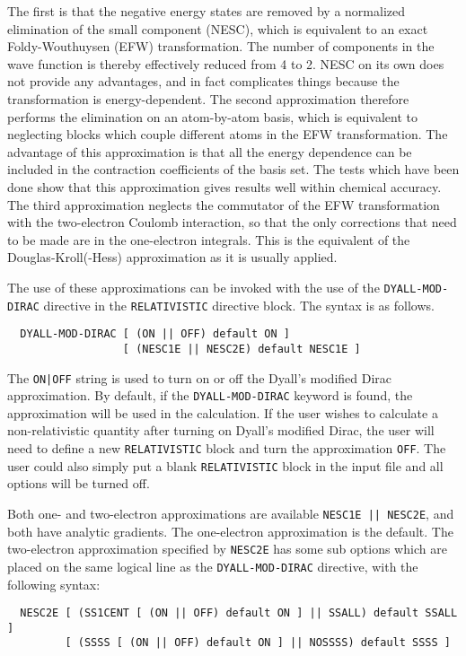The first is that the negative energy states are removed by a normalized
elimination of the small component (NESC), which is equivalent to an exact
Foldy-Wouthuysen (EFW) transformation. The number of components in the wave
function is thereby effectively reduced from 4 to 2. NESC on its own does
not provide any advantages, and in fact complicates things because the
transformation is energy-dependent. The second approximation therefore
performs the elimination on an atom-by-atom basis, which is equivalent to
neglecting blocks which couple different atoms in the EFW transformation.
The advantage of this approximation is that all the energy dependence can be
included in the contraction coefficients of the basis set.  The tests which
have been done show that this approximation gives results well within
chemical accuracy. The third approximation neglects the commutator of the
EFW transformation with the two-electron Coulomb interaction, so that the
only corrections that need to be made are in the one-electron integrals.
This is the equivalent of the Douglas-Kroll(-Hess) approximation as it is
usually applied.

The use of these approximations can be invoked with the use of the
\verb+DYALL-MOD-DIRAC+ directive in the \verb+RELATIVISTIC+ directive block.
The syntax is as follows.

\begin{verbatim}
  DYALL-MOD-DIRAC [ (ON || OFF) default ON ] 
                  [ (NESC1E || NESC2E) default NESC1E ]
\end{verbatim}

The \verb+ON|OFF+ string is used to turn on or off the
Dyall's modified Dirac approximation.  By default, if the \verb+DYALL-MOD-DIRAC+
keyword is found, the approximation will be used in the calculation.
If the user wishes to calculate a non-relativistic quantity after turning
on Dyall's modified Dirac, the user will need to define a new 
\verb+RELATIVISTIC+
block and turn the approximation \verb+OFF+.  The user could also simply
put a blank \verb+RELATIVISTIC+ block in the input file and all options 
will be turned off.

Both one- and two-electron approximations are available
\verb+NESC1E || NESC2E+, and both have
analytic gradients. The one-electron approximation is the default.
The two-electron approximation specified by \verb+NESC2E+ has some sub
options which are placed on the same logical line as the
\verb+DYALL-MOD-DIRAC+ directive, with the following syntax:

\begin{verbatim}
  NESC2E [ (SS1CENT [ (ON || OFF) default ON ] || SSALL) default SSALL ]
         [ (SSSS [ (ON || OFF) default ON ] || NOSSSS) default SSSS ]
\end{verbatim}

